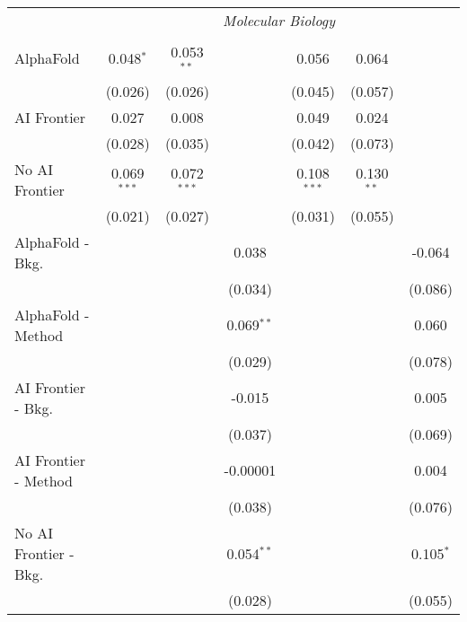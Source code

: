 \begin{tabular}{lcccccc}
 & \multicolumn{6}{c}{\textit{Molecular Biology}} \\ \\
   AlphaFold               & 0.048$^{*}$   & 0.053$^{**}$  &              & 0.056         & 0.064        &   \\   
                           & (0.026)       & (0.026)       &              & (0.045)       & (0.057)      &   \\   
   AI Frontier             & 0.027         & 0.008         &              & 0.049         & 0.024        &   \\   
                           & (0.028)       & (0.035)       &              & (0.042)       & (0.073)      &   \\   
   No AI Frontier          & 0.069$^{***}$ & 0.072$^{***}$ &              & 0.108$^{***}$ & 0.130$^{**}$ &   \\   
                           & (0.021)       & (0.027)       &              & (0.031)       & (0.055)      &   \\   
   AlphaFold - Bkg.        &               &               & 0.038        &               &              & -0.064\\   
                           &               &               & (0.034)      &               &              & (0.086)\\   
   AlphaFold - Method      &               &               & 0.069$^{**}$ &               &              & 0.060\\   
                           &               &               & (0.029)      &               &              & (0.078)\\   
   AI Frontier - Bkg.      &               &               & -0.015       &               &              & 0.005\\   
                           &               &               & (0.037)      &               &              & (0.069)\\   
   AI Frontier - Method    &               &               & -0.00001     &               &              & 0.004\\   
                           &               &               & (0.038)      &               &              & (0.076)\\   
   No AI Frontier - Bkg.   &               &               & 0.054$^{**}$ &               &              & 0.105$^{*}$\\   
                           &               &               & (0.028)      &               &              & (0.055)\\   

\end{tabular}
